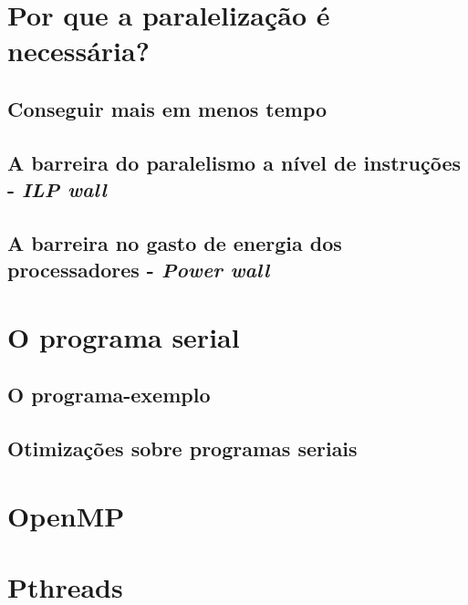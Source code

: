 		    
	\chapter{Por que a paralelização é necessária?}
	
		\section{Conseguir mais em menos tempo}
		
	
		\section{A barreira do paralelismo a nível de instruções - \textit{ILP wall}}
		
		\section{A barreira no gasto de energia dos processadores - \textit{Power wall}}
	
    \chapter{O programa serial}
    
	    \section{O programa-exemplo}
	    
	    \section{Otimizações sobre programas seriais}
    
    \chapter{OpenMP}
    
    \chapter{Pthreads}
    
